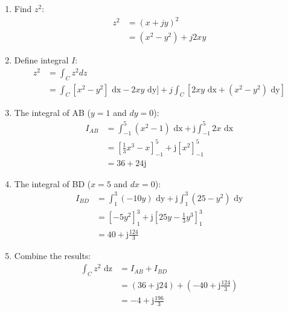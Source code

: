 \documentclass[10pt,a4paper]{article}
\begin{document}
\begin{enumerate}
    \item Find $z^2$:
    \begin{equation*} 
        \begin{aligned}
            z^2 &= (x+jy)^2 \\
            &= (x^2 - y^2) + j2xy
        \end{aligned}
    \end{equation*}
    \item Define integral $I$:
    \begin{equation*} 
        \begin{aligned}
            z^2 &= \int_C z^2 dz \\
            &= \int_C [x^2 - y^2]\text{ dx} - 2xy \text{ dy}] + j\int_C [2xy\text{ dx}+(x^2 - y^2)\text{ dy}]
        \end{aligned}
    \end{equation*}
    \item The integral of AB ($y=1$ and $dy=0$):
    \begin{equation*} 
        \begin{aligned}
            I_{AB} &= \int_{-1}^5 (x^2 - 1)\text{ dx}+\text{j}\int_{-1}^5 2x \text{ dx} \\
            &= [\frac{1}{3}x^3 - x]_{-1}^5 + \text{j}[x^2]_{-1}^5 \\
            &= 36 + 24\text{j}
        \end{aligned}
    \end{equation*}
    \item The integral of BD ($x=5$ and $dx=0$):
    \begin{equation*} 
        \begin{aligned}
            I_{BD} &= \int_{1}^3 (-10y)\text{ dy}+\text{j}\int_{1}^3 (25-y^2) \text{ dy} \\
            &= [-5y^2]_1^3 + \text{j}[25y - \frac{1}{3}y^3]_1^3 \\
            &= 40+\text{j}\frac{124}{3}
        \end{aligned}
    \end{equation*}
    \item Combine the results:
    \begin{equation*} 
        \begin{aligned}
            \int_C z^2 \text{ dz} &= I_{AB} + I_{BD} \\
            &= (36 + \text{j}24) + (-40 + \text{j}\frac{124}{3}) \\
            &= -4 + \text{j}\frac{196}{3}
        \end{aligned}
    \end{equation*}
\end{enumerate}
\end{document}
